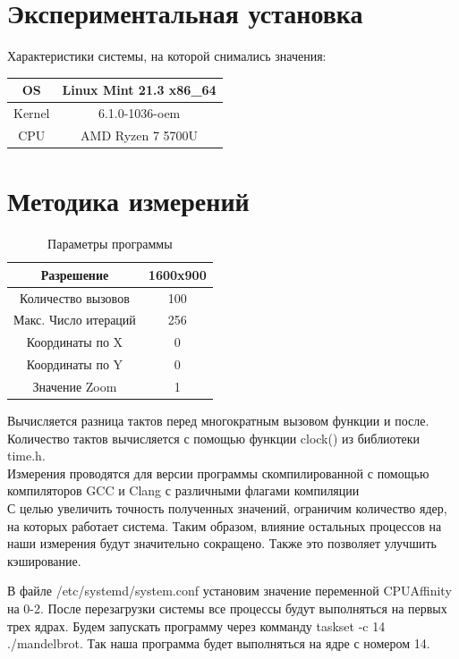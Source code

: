 \documentclass[a4paper, 12pt]{article}
\begin{document}
\section*{Экспериментальная установка}
Характеристики системы, на которой снимались значения:
\begin{table}[h]
    \centering
    \begin{tabular}{|c|c|}
        \hline
        OS         & Linux Mint 21.3 x86\_64 \\\hline
        Kernel     & 6.1.0-1036-oem          \\\hline
        CPU        & AMD Ryzen 7 5700U       \\\hline
    \end{tabular}
\end{table}


\section*{Методика измерений}
\begin{table}[h]
    \centering
    \begin{tabular}{|c|c|}
        \hline
        Разрешение           & 1600x900 \\\hline
        Количество вызовов   & 100      \\\hline
        Макс. Число итераций & 256      \\\hline
        Координаты по X      & 0        \\\hline
        Координаты по Y      & 0        \\\hline
        Значение Zoom        & 1        \\\hline
    \end{tabular}
    \caption{Параметры программы}
\end{table}
Вычисляется разница тактов перед многократным вызовом функции и после.
Количество тактов вычисляется с помощью функции clock() из библиотеки time.h.\\

Измерения проводятся для версии программы скомпилированной с помощью компиляторов GCC и Clang с различными флагами компиляции\\

С целью увеличить точность полученных значений, ограничим количество ядер, на которых работает система. Таким образом, влияние остальных процессов на наши измерения будут значительно сокращено. Также это позволяет улучшить кэширование.

В файле /etc/systemd/system.conf установим значение переменной CPUAffinity на 0-2. После перезагрузки системы все процессы будут выполняться на первых трех ядрах.
Будем запускать программу через комманду taskset -c 14 ./mandelbrot. Так наша программа будет выполняться на ядре с номером 14.\\
\end{document}
